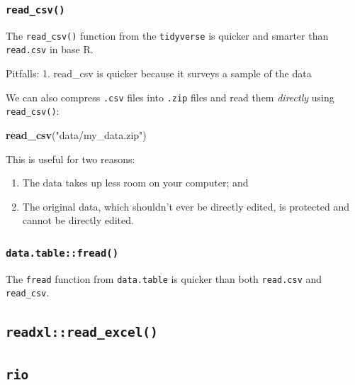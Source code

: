 \documentclass[]{book}
\newenvironment{Shaded}{\begin{snugshade}}{\end{snugshade}}
\newcommand{\KeywordTok}[1]{\textcolor[rgb]{0.13,0.29,0.53}{\textbf{#1}}}
\newcommand{\NormalTok}[1]{#1}
\newcommand{\StringTok}[1]{\textcolor[rgb]{0.31,0.60,0.02}{#1}}
\providecommand{\tightlist}{%
  \setlength{\itemsep}{0pt}\setlength{\parskip}{0pt}}
\begin{document}
\hypertarget{read_csv}{%
\subsubsection{\texorpdfstring{\texttt{read\_csv()}}{read\_csv()}}\label{read_csv}}

The \texttt{read\_csv()} function from the \texttt{tidyverse} is quicker and smarter than \texttt{read.csv} in base R.

Pitfalls:
1. read\_csv is quicker because it surveys a sample of the data

We can also compress \texttt{.csv} files into \texttt{.zip} files and read them \emph{directly} using \texttt{read\_csv()}:

\begin{Shaded}
\begin{Highlighting}[]
\KeywordTok{read_csv}\NormalTok{(}\StringTok{"data/my_data.zip"}\NormalTok{)}
\end{Highlighting}
\end{Shaded}

This is useful for two reasons:

\begin{enumerate}
\def\labelenumi{\arabic{enumi}.}
\tightlist
\item
  The data takes up less room on your computer; and
\item
  The original data, which shouldn't ever be directly edited, is protected and cannot be directly edited.
\end{enumerate}

\hypertarget{data.tablefread}{%
\subsubsection{\texorpdfstring{\texttt{data.table::fread()}}{data.table::fread()}}\label{data.tablefread}}

The \texttt{fread} function from \texttt{data.table} is quicker than both \texttt{read.csv} and \texttt{read\_csv}.

\hypertarget{readxlread_excel}{%
\subsection{\texorpdfstring{\texttt{readxl::read\_excel()}}{readxl::read\_excel()}}\label{readxlread_excel}}

\hypertarget{rio}{%
\subsection{\texorpdfstring{\texttt{rio}}{rio}}\label{rio}}
\end{document}
